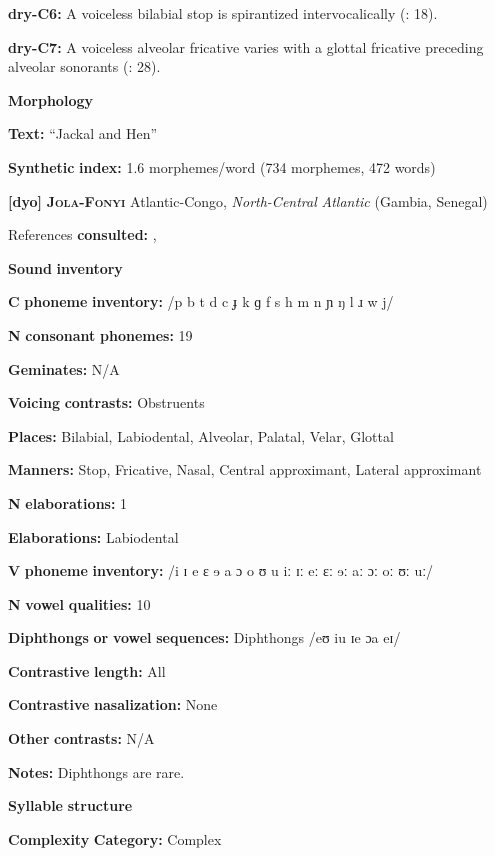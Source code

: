 \textbf{dry-C6:} A voiceless bilabial stop is spirantized intervocalically (\citealt{KotapishKotapish1973}: 18).

\textbf{dry-C7:} A voiceless alveolar fricative varies with a glottal fricative preceding alveolar sonorants (\citealt{KotapishKotapish1973}: 28).

\textbf{Morphology}

\textbf{Text:} “Jackal and Hen” \citep[180-192]{Dhakal2012}

\textbf{Synthetic} \textbf{index:} 1.6 morphemes/word (734 morphemes, 472 words)

\textbf{[dyo]}   \textbf{\textsc{Jola-Fonyi}}  Atlantic-Congo, \textit{North-Central} \textit{Atlantic} (Gambia, Senegal)

References \textbf{consulted:} \citet{Lavergne1979}, \citet{Sapir1965}

\textbf{Sound} \textbf{inventory}

\textbf{C} \textbf{phoneme} \textbf{inventory:} /p b t d c ɟ k ɡ f s h m n ɲ ŋ l ɹ w j/

\textbf{N} \textbf{consonant} \textbf{phonemes:} 19

\textbf{Geminates:} N/A

\textbf{Voicing} \textbf{contrasts:} Obstruents

\textbf{Places:} Bilabial, Labiodental, Alveolar, Palatal, Velar, Glottal

\textbf{Manners:} Stop, Fricative, Nasal, Central approximant, Lateral approximant

\textbf{N} \textbf{elaborations:} 1

\textbf{Elaborations:} Labiodental

\textbf{V} \textbf{phoneme} \textbf{inventory:} /i ɪ e ɛ ɘ a ɔ o ʊ u iː ɪː eː ɛː ɘː aː ɔː oː ʊː uː/

\textbf{N} \textbf{vowel} \textbf{qualities:} 10

\textbf{Diphthongs} \textbf{or} \textbf{vowel} \textbf{sequences:} Diphthongs /eʊ iu ɪe ɔa eɪ/

\textbf{Contrastive} \textbf{length:} All

\textbf{Contrastive} \textbf{nasalization:} None

\textbf{Other} \textbf{contrasts:} N/A

\textbf{Notes:} Diphthongs are rare.

\textbf{Syllable} \textbf{structure}

\textbf{Complexity} \textbf{Category:} Complex

